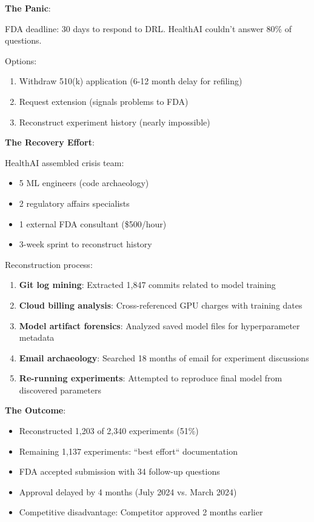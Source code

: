 \textbf{The Panic}:

FDA deadline: 30 days to respond to DRL. HealthAI couldn't answer 80\% of questions.

Options:
\begin{enumerate}
    \item Withdraw 510(k) application (6-12 month delay for refiling)
    \item Request extension (signals problems to FDA)
    \item Reconstruct experiment history (nearly impossible)
\end{enumerate}

\textbf{The Recovery Effort}:

HealthAI assembled crisis team:
\begin{itemize}
    \item 5 ML engineers (code archaeology)
    \item 2 regulatory affairs specialists
    \item 1 external FDA consultant (\$500/hour)
    \item 3-week sprint to reconstruct history
\end{itemize}

Reconstruction process:
\begin{enumerate}
    \item \textbf{Git log mining}: Extracted 1,847 commits related to model training
    \item \textbf{Cloud billing analysis}: Cross-referenced GPU charges with training dates
    \item \textbf{Model artifact forensics}: Analyzed saved model files for hyperparameter metadata
    \item \textbf{Email archaeology}: Searched 18 months of email for experiment discussions
    \item \textbf{Re-running experiments}: Attempted to reproduce final model from discovered parameters
\end{enumerate}

\textbf{The Outcome}:

\begin{itemize}
    \item Reconstructed 1,203 of 2,340 experiments (51\%)
    \item Remaining 1,137 experiments: ``best effort`` documentation
    \item FDA accepted submission with 34 follow-up questions
    \item Approval delayed by 4 months (July 2024 vs. March 2024)
    \item Competitive disadvantage: Competitor approved 2 months earlier
\end{itemize}

